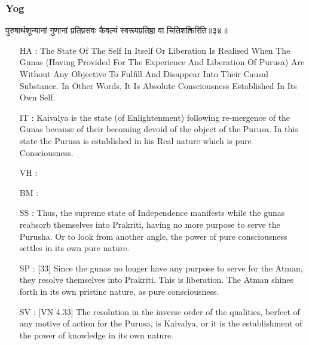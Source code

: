 \begin{frame}[fragile]\frametitle{Yog}
\begin{sanskrit}
पुरुषार्थशून्यानां गुणानां प्रतिप्रसवः कैवल्यं स्वरूपप्रतिष्ठा वा चितिशक्तिरिति॥३४॥
\end{sanskrit}

	\begin{itemize}
	\item [HA]: The State Of The Self In Itself Or Liberation Is Realised When The Gunas (Having Provided For The Experience And Liberation Of Purusa) Are Without Any Objective To Fulfill And Disappear Into Their Causal Substance. In Other Words, It Is Absolute Consciousness Established In Its Own Self.
	\item [IT]: Kaivalya is the state (of Enlightenment) following re-mergence of the Gunas because of their becoming devoid of the object of the Purusa. In this state the Purusa is established in his Real nature which is pure Consciousness.
	\item [VH]: 
	\item [BM]: 
	\item [SS]: Thus, the supreme state of Independence manifests while the gunas reabsorb themselves into Prakriti, having no more purpose to serve the Purusha. Or to look from another angle, the power of pure consciousness settles in its own pure nature.
	\item [SP]: [33] Since the gunas no longer have any purpose to serve for the Atman, they resolve themselves into Prakriti. This is liberation. The Atman shines forth in its own pristine nature, as pure consciousness.
	\item [SV]: [VN 4.33] The resolution in the inverse order of the qualities, berfect of any motive of action for the Purusa, is Kaivalya, or it is the establishment of the power of knowledge in its own nature. 
	\end{itemize}
\end{frame}

